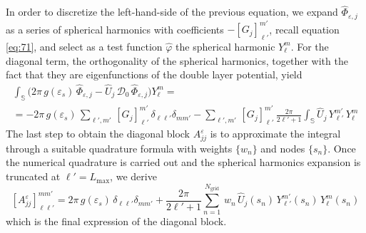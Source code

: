 \documentclass[aip,jcp,a4paper,11pt]{revtex4-1}
\begin{document}
In order to discretize the left-hand-side of the previous equation, we expand $\hat{\Phi}_{\varepsilon,j}$ as a series of spherical harmonics with coefficients $-[G_j]_{\ell'}^{m'}$, recall equation \eqref{eq:71}, and select as a test function $\hat{\varphi}$  the spherical harmonic $Y_{\ell}^{m}$. For the diagonal term, the orthogonality of the spherical harmonics, together with the fact that they are eigenfunctions of the double layer potential, yield
\begin{multline*}
 \int_{\mathbb{S}}\big( 2\pi \, g(\varepsilon_s) \, \hat{\Phi}_{\varepsilon,j} - \hat{U}_j \, {\mathcal{D}}_0 \, \hat{\Phi}_{\varepsilon,j} \big) Y_\ell^m = \\
= - 2 \pi  \, g(\varepsilon_s) \, \sum_{\ell',m'}  \, [G_j]_{\ell'}^{m'} \, \delta_{\ell \ell'} \delta_{mm'}  - \sum_{\ell',m'} \, [G_j]_{\ell'}^{m'} \, \frac{2\pi}{2\ell'+1} \int_{\mathbb{S}} \hat{U}_j \,  Y_{\ell'}^{m'}\, Y_\ell^m
\end{multline*}
The last step to obtain the diagonal block $A_{jj}^\varepsilon$ is to approximate the integral through a suitable quadrature formula with weights $\{w_n\}$ and nodes $\{ s_n\}$. Once the numerical quadrature is carried out and the spherical harmonics expansion is truncated at $\ell' = L_\text{max}$, we derive
\begin{equation}\label{eq:ajj}
[A_{jj}^\varepsilon]_{\ell \ell'}^{mm'} = 2\pi \, g(\varepsilon_s) %
 \,  \delta_{\ell \ell'} \delta_{mm'} + \frac{2\pi}{2\ell'+1} \sum_{n=1}^{N_\text{grid}} \, w_n \, \hat{U}_j(s_n)  \, Y_{\ell'}^{m'}(s_n)\,  Y_\ell^m(s_n)
\end{equation}
which is the final expression of the diagonal block.
\end{document}
